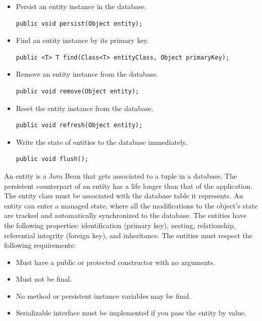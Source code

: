     \begin{itemize}
        \item Persist an entity instance in the database.
            \begin{lstlisting}[style=Java]
public void persist(Object entity);
            \end{lstlisting}
        \item Find an entity instance by its primary key.
            \begin{lstlisting}[style=Java]
public <T> T find(Class<T> entityClass, Object primaryKey); 
            \end{lstlisting}
        \item Remove an entity instance from the database.
            \begin{lstlisting}[style=Java]
public void remove(Object entity); 
            \end{lstlisting}
        \item Reset the entity instance from the database.
            \begin{lstlisting}[style=Java]
public void refresh(Object entity); 
            \end{lstlisting}
        \item Write the state of entities to the database immediately.
            \begin{lstlisting}[style=Java]
public void flush();
            \end{lstlisting}
    \end{itemize}
    An entity is a Java Bean that gets associated to a tuple in a database. The persistent counterpart of an entity has a life longer than that of the application. 
    The entity class must be associated with the database table it represents. An entity can enter a managed state, where all the modifications to the object's state
    are tracked and automatically synchronized to the database. The entities have the following properties: identification (primary key), nesting, relationship, 
    referential integrity (foreign key), and inheritance. The entities must respect the following requirements:
    \begin{itemize}
        \item Must have a public or protected constructor with no arguments. 
        \item Must not be final.
        \item No method or persistent instance variables may be final.
        \item Serializable interface must be implemented if you pass the entity by value.
    \end{itemize}
    
